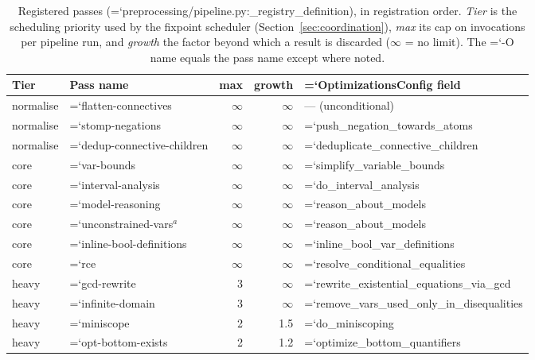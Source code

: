 \documentclass[10pt,a4paper]{article}
\newcommand{\code}[1]{{\small\ttfamily\hyphenchar\font=`\-\relax #1}}
\begin{document}
\begin{table}[t]
\centering
\footnotesize
\caption{Registered passes (\code{preprocessing/pipeline.py:\allowbreak \_\allowbreak registry\_\allowbreak definition}), in registration
order.  \emph{Tier} is the scheduling priority used by the fixpoint scheduler
(Section~\ref{sec:coordination}), \emph{max} its cap on invocations per pipeline run, and
\emph{growth} the factor beyond which a result is discarded ($\infty$ = no limit).  The \code{-O} name
equals the pass name except where noted.}
\label{tab:passes}
\begin{tabular}{llrrl}
\toprule
Tier & Pass name & max & growth & \code{OptimizationsConfig} field \\
\midrule
normalise & \code{flatten-connectives}       & $\infty$ & $\infty$ & --- (unconditional) \\
normalise & \code{stomp-negations}           & $\infty$ & $\infty$ & \code{push\_negation\_towards\_atoms} \\
normalise & \code{dedup-connective-children} & $\infty$ & $\infty$ & \code{deduplicate\_connective\_children} \\
\midrule
core & \code{var-bounds}              & $\infty$ & $\infty$ & \code{simplify\_variable\_bounds} \\
core & \code{interval-analysis}       & $\infty$ & $\infty$ & \code{do\_interval\_analysis} \\
core & \code{model-reasoning}         & $\infty$ & $\infty$ & \code{reason\_about\_models} \\
core & \code{unconstrained-vars}$^a$  & $\infty$ & $\infty$ & \code{reason\_about\_models} \\
core & \code{inline-bool-definitions} & $\infty$ & $\infty$ & \code{inline\_bool\_var\_definitions} \\
core & \code{rce}                     & $\infty$ & $\infty$ & \code{resolve\_conditional\_equalities} \\
\midrule
heavy & \code{gcd-rewrite}          & 3 & $\infty$ & \code{rewrite\_\allowbreak existential\_\allowbreak equations\_\allowbreak via\_\allowbreak gcd} \\
heavy & \code{infinite-domain}      & 3 & $\infty$ & \code{remove\_\allowbreak vars\_\allowbreak used\_\allowbreak only\_\allowbreak in\_\allowbreak disequalities} \\
heavy & \code{miniscope}            & 2 & 1.5 & \code{do\_miniscoping} \\
heavy & \code{opt-bottom-exists}    & 2 & 1.2 & \code{optimize\_bottom\_quantifiers} \\

\end{tabular}
\end{table}
\end{document}
